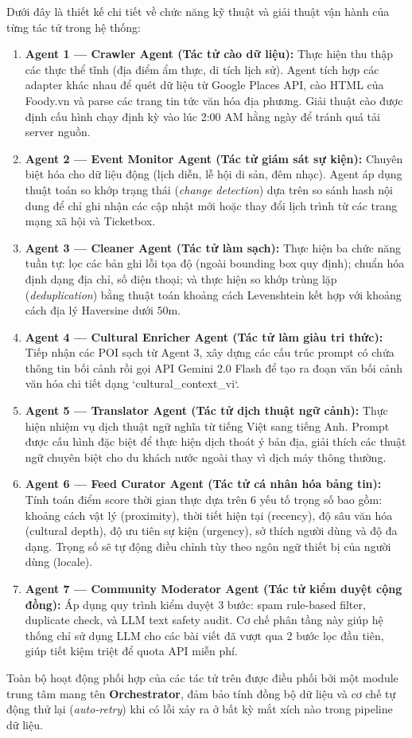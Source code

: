 Dưới đây là thiết kế chi tiết về chức năng kỹ thuật và giải thuật vận hành của từng tác tử trong hệ thống:
\begin{enumerate}
    \item \textbf{Agent 1 --- Crawler Agent (Tác tử cào dữ liệu):} Thực hiện thu thập các thực thể tĩnh (địa điểm ẩm thực, di tích lịch sử). Agent tích hợp các adapter khác nhau để quét dữ liệu từ Google Places API, cào HTML của Foody.vn và parse các trang tin tức văn hóa địa phương. Giải thuật cào được định cấu hình chạy định kỳ vào lúc 2:00 AM hằng ngày để tránh quá tải server nguồn.
    \item \textbf{Agent 2 --- Event Monitor Agent (Tác tử giám sát sự kiện):} Chuyên biệt hóa cho dữ liệu động (lịch diễn, lễ hội di sản, đêm nhạc). Agent áp dụng thuật toán so khớp trạng thái (\textit{change detection}) dựa trên so sánh hash nội dung để chỉ ghi nhận các cập nhật mới hoặc thay đổi lịch trình từ các trang mạng xã hội và Ticketbox.
    \item \textbf{Agent 3 --- Cleaner Agent (Tác tử làm sạch):} Thực hiện ba chức năng tuần tự: lọc các bản ghi lỗi tọa độ (ngoài bounding box quy định); chuẩn hóa định dạng địa chỉ, số điện thoại; và thực hiện so khớp trùng lặp (\textit{deduplication}) bằng thuật toán khoảng cách Levenshtein kết hợp với khoảng cách địa lý Haversine dưới $50\text{m}$.
    \item \textbf{Agent 4 --- Cultural Enricher Agent (Tác tử làm giàu tri thức):} Tiếp nhận các POI sạch từ Agent 3, xây dựng các cấu trúc prompt có chứa thông tin bối cảnh rồi gọi API Gemini 2.0 Flash để tạo ra đoạn văn bối cảnh văn hóa chi tiết dạng `cultural\_context\_vi`.
    \item \textbf{Agent 5 --- Translator Agent (Tác tử dịch thuật ngữ cảnh):} Thực hiện nhiệm vụ dịch thuật ngữ nghĩa từ tiếng Việt sang tiếng Anh. Prompt được cấu hình đặc biệt để thực hiện dịch thoát ý bản địa, giải thích các thuật ngữ chuyên biệt cho du khách nước ngoài thay vì dịch máy thông thường.
    \item \textbf{Agent 6 --- Feed Curator Agent (Tác tử cá nhân hóa bảng tin):} Tính toán điểm score thời gian thực dựa trên 6 yếu tố trọng số bao gồm: khoảng cách vật lý (proximity), thời tiết hiện tại (recency), độ sâu văn hóa (cultural depth), độ ưu tiên sự kiện (urgency), sở thích người dùng và độ đa dạng. Trọng số sẽ tự động điều chỉnh tùy theo ngôn ngữ thiết bị của người dùng (locale).
    \item \textbf{Agent 7 --- Community Moderator Agent (Tác tử kiểm duyệt cộng đồng):} Áp dụng quy trình kiểm duyệt 3 bước: spam rule-based filter, duplicate check, và LLM text safety audit. Cơ chế phân tầng này giúp hệ thống chỉ sử dụng LLM cho các bài viết đã vượt qua 2 bước lọc đầu tiên, giúp tiết kiệm triệt để quota API miễn phí.
\end{enumerate}

Toàn bộ hoạt động phối hợp của các tác tử trên được điều phối bởi một module trung tâm mang tên \textbf{Orchestrator}, đảm bảo tính đồng bộ dữ liệu và cơ chế tự động thử lại (\textit{auto-retry}) khi có lỗi xảy ra ở bất kỳ mắt xích nào trong pipeline dữ liệu.
